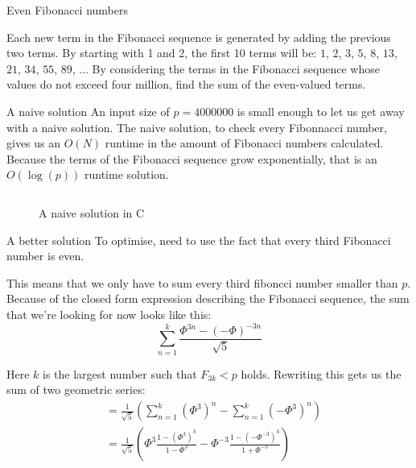 \documentclass[main.tex]{subfiles}
\begin{document}
\begin{prob}{2}{Even Fibonacci numbers}
  \begin{problem}
    Each new term in the Fibonacci sequence is generated by adding the previous two terms. By starting with 1 and 2, the first 10 terms will be: $1$, $2$, $3$, $5$, $8$, $13$, $21$, $34$, $55$, $89$, ...
    By considering the terms in the Fibonacci sequence whose values do not exceed four million, find the sum of the even-valued terms.
  \end{problem}
  \begin{solutions}
    \begin{solution}{A naive solution}
      An input size of $p=4000000$ is small enough to let us get away with a naive solution.
      The naive solution, to check every Fibonnacci number, gives us an $O(N)$ runtime in the amount of Fibonacci numbers calculated.
      Because the terms of the Fibonacci sequence grow exponentially, that is an $O(\log(p))$ runtime solution.

      \begin{figure}[H]
        \inputminted[firstline=15, lastline=33]{c}{\sol{002}{c}/naive.c}
        \caption{A naive solution in C}
      \end{figure}

    \end{solution}
    \begin{solution}{A better solution}
      To optimise, need to use the fact that every third Fibonacci number is even.

      This means that we only have to sum every third fiboncci number smaller than $p$.
      Because of the closed form expression describing the Fibonacci sequence, the sum that we're looking for now looks like this:
      \[ \sum_{n=1}^{k}\frac{\Phi^{3n} - (-\Phi)^{-3n}}{\sqrt{5}} \]

      Here $k$ is the largest number such that $F_{3k} < p$ holds.
      Rewriting this gets us the sum of two geometric series:
      \begin{align*}
        &= \frac{1}{\sqrt{5}}\left( \sum_{n=1}^{k}(\Phi^{3})^{n} - \sum_{n=1}^{k}(-\Phi^{3})^{n} \right)\\
        &= \frac{1}{\sqrt{5}}\left( \Phi^{3}\frac{1-\left(\Phi^{3}\right)^{k}}{1-\Phi^{3}} - \Phi^{-3}\frac{1-\left(-\Phi^{-3}\right)^{k}}{1+\Phi^{-3}} \right)
      \end{align*}


\end{solution}
\end{solutions}
\end{prob}
\end{document}
